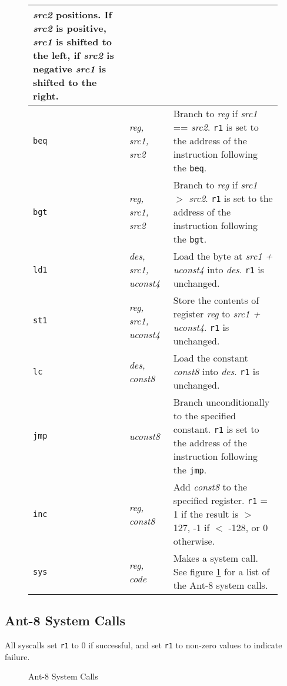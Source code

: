 \begin{figure}
\begin{tabular}{|ll|p{4.5in}|}
		{\em src2} positions.  If {\em src2} is positive,
		{\em src1} is shifted to the left, if {\em src2}
		is negative {\em src1} is shifted to the right. \\
\hline
{\tt beq}       & {\em reg, src1, src2} &
		Branch to {\em reg} if {\em src1} == {\em src2}.
		{\tt r1} is set to the address of the instruction
		following the {\tt beq}. \\
\hline
{\tt bgt}       & {\em reg, src1, src2} &
		Branch to {\em reg} if {\em src1} $>$ {\em src2}.
		{\tt r1} is set to the address of the instruction
		following the {\tt bgt}. \\
\hline
{\tt ld1}        & {\em des, src1, uconst4} & 
		Load the byte at {\em src1 + uconst4} into {\em des}.
		{\tt r1} is unchanged.  \\
\hline
{\tt st1}        & {\em reg, src1, uconst4} &
		Store the contents of register
		{\em reg} to {\em src1 + uconst4}.
		{\tt r1} is unchanged.  \\
\hline
{\tt lc}        & {\em des, const8}      & 
		Load the constant {\em const8} into {\em des}.
		{\tt r1} is unchanged. \\
\hline
{\tt jmp}	& {\em uconst8}	&
		Branch unconditionally to the specified constant.
		{\tt r1} is set to the address
		of the instruction following the {\tt jmp}. \\
\hline
{\tt inc}	& {\em reg, const8}	&
		Add {\em const8} to the specified register.
                {\tt r1} = 1 if the result is $>$ 127, -1 if $<$ -128, or
		0 otherwise. \\
\hline
        {\tt sys}   & {\em reg, code}       &
                Makes a system call.
                See figure \ref{syscall-table}
		for a list of the Ant-8 system calls.
        \\
\hline 
\end{tabular}
\end{figure}
\vspace{3mm}

\subsection{Ant-8 System Calls}
\label{syscall-sec}

All syscalls set {\tt r1} to 0 if successful, and set {\tt r1} to
non-zero values to indicate failure. 

\begin{figure}
\caption{ \label{syscall-table} Ant-8 System Calls}
\vspace{3mm}

\end{figure}

